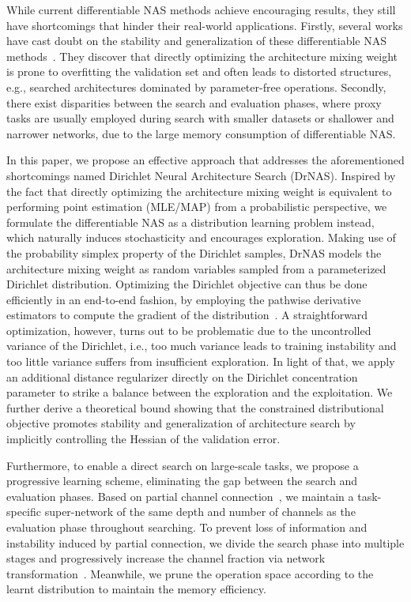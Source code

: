 \documentclass{article} \usepackage{iclr2021_conference,times}
\begin{document}
While current differentiable NAS methods achieve encouraging results, they still have shortcomings that hinder their real-world applications.
Firstly, 
several works have cast doubt on the stability and generalization of these differentiable NAS methods~\citep{smoothdarts, understanding}. They discover that directly optimizing the architecture mixing weight is prone to overfitting the validation set and often leads to distorted structures, e.g., searched architectures dominated by parameter-free operations.
Secondly, there exist disparities between the search and evaluation phases, where proxy tasks are usually employed during search with smaller datasets or shallower and narrower networks, due to the large memory consumption of differentiable NAS.





In this paper, we propose an effective approach that addresses the aforementioned shortcomings named Dirichlet Neural Architecture Search (DrNAS).
Inspired by the fact that directly optimizing the architecture mixing weight is equivalent to performing point estimation (MLE/MAP) from a probabilistic perspective, we formulate the differentiable NAS as a distribution learning problem instead, which naturally induces stochasticity and encourages exploration.
Making use of the probability simplex property of the Dirichlet samples, DrNAS models the architecture mixing weight as random variables sampled from a parameterized Dirichlet distribution. Optimizing the Dirichlet objective can thus be done efficiently in an end-to-end fashion, by employing the pathwise derivative estimators to compute the gradient of the distribution~\citep{pathwise}.
A straightforward optimization, however, turns out to be problematic due to the uncontrolled variance of the Dirichlet, i.e., too much variance leads to training instability and too little variance suffers from insufficient exploration.
In light of that, we apply an additional distance regularizer directly on the Dirichlet concentration parameter to strike a balance between the exploration and the exploitation.
We further derive a theoretical bound showing that the constrained distributional objective promotes stability and generalization of architecture search by implicitly controlling the Hessian of the validation error.






Furthermore, to enable a direct search on large-scale tasks, we propose a progressive 
learning scheme, eliminating the gap between the search and evaluation phases.
Based on partial channel connection~\citep{pcdarts}, we maintain a task-specific super-network of the same depth and number of channels as the evaluation phase throughout searching.
To prevent loss of information and instability induced by partial connection, we divide the search phase into multiple stages and progressively increase the channel fraction via network transformation~\citep{net2net}. 
Meanwhile, we prune the operation space according to the learnt distribution to maintain the memory efficiency.
\end{document}
